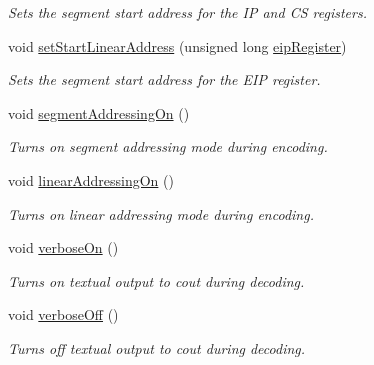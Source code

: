 \begin{DoxyCompactItemize}
\begin{DoxyCompactList}\small\item\em Sets the segment start address for the I\-P and C\-S registers. \end{DoxyCompactList}\item 
void \hyperlink{classintelhex_a7629ca097b2de02dea37fcaa2dc2709c}{set\-Start\-Linear\-Address} (unsigned long \hyperlink{classintelhex_abedd6ca388d3cad1d2525abc5939d27e}{eip\-Register})
\begin{DoxyCompactList}\small\item\em Sets the segment start address for the E\-I\-P register. \end{DoxyCompactList}\item 
void \hyperlink{classintelhex_a489fc3b9c34542def2a5167192b291da}{segment\-Addressing\-On} ()
\begin{DoxyCompactList}\small\item\em Turns on segment addressing mode during encoding. \end{DoxyCompactList}\item 
void \hyperlink{classintelhex_a5055edd337d19037ab254a27016267f8}{linear\-Addressing\-On} ()
\begin{DoxyCompactList}\small\item\em Turns on linear addressing mode during encoding. \end{DoxyCompactList}\item 
void \hyperlink{classintelhex_ac6a0119a04a2090af3ffe8c33a37cbc9}{verbose\-On} ()
\begin{DoxyCompactList}\small\item\em Turns on textual output to cout during decoding. \end{DoxyCompactList}\item 
void \hyperlink{classintelhex_a3958f077a662291bbde3472ea2bcfb4d}{verbose\-Off} ()
\begin{DoxyCompactList}\small\item\em Turns off textual output to cout during decoding. \end{DoxyCompactList}\end{DoxyCompactItemize}
